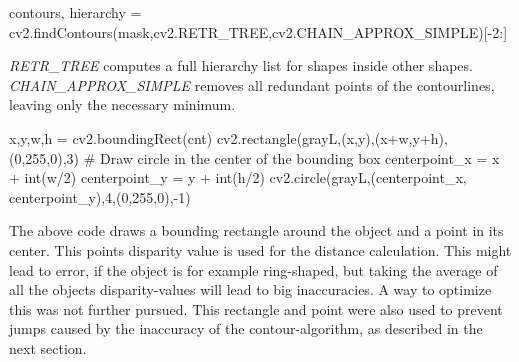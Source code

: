 \documentclass[journal,onecolumn]{IEEEtran}
\begin{document}
\begin{python}
contours, hierarchy = cv2.findContours(mask,cv2.RETR_TREE,cv2.CHAIN_APPROX_SIMPLE)[-2:]
\end{python}
\emph{RETR\_TREE} computes a full hierarchy list for shapes inside other shapes. \emph{CHAIN\_APPROX\_SIMPLE} removes all redundant points of the contourlines, leaving only the necessary minimum.
\begin{python}
x,y,w,h = cv2.boundingRect(cnt)
cv2.rectangle(grayL,(x,y),(x+w,y+h),(0,255,0),3)
# Draw circle in the center of the bounding box
centerpoint_x = x + int(w/2)
centerpoint_y = y + int(h/2)
cv2.circle(grayL,(centerpoint_x, centerpoint_y),4,(0,255,0),-1)
\end{python}
\noindent The above code draws a bounding rectangle around the object and a point in its center. This points disparity value is used for the distance calculation. This might lead to error, if the object is for example ring-shaped, but taking the average of all the objects disparity-values will lead to big inaccuracies. A way to optimize this was not further pursued. \newline
This rectangle and point were also used to prevent jumps caused by the inaccuracy of the contour-algorithm, as described in the next section.
\end{document}
